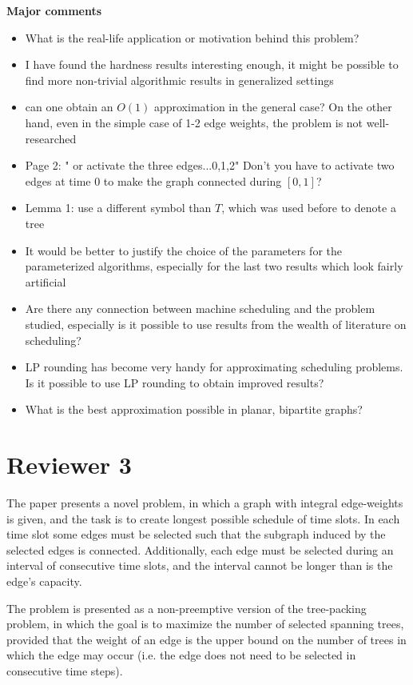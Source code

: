\documentclass[11pt,a4paper]{article}
\begin{document}
\textbf{Major comments}
\begin{itemize}

\item What is the real-life application or motivation behind this problem? 
\item I have found the hardness results interesting enough, it might be possible to find more non-trivial algorithmic results in generalized settings 
\item can one obtain an $O(1)$ approximation in the general case? On the other hand, even in the simple case of 1-2 edge weights, the problem is not well-researched
\item Page 2: " or activate the three edges...0,1,2" Don't you have to activate two edges at time 0 to make the graph connected during $[0,1]$?
\item Lemma 1: use a different symbol than $T$, which was used before to denote a tree
\item It would be better to justify the choice of the parameters for the parameterized algorithms, especially for the last two results which look fairly artificial
\item Are there any connection between machine scheduling and the problem studied, especially is it possible to use results from the wealth of literature on scheduling?
\item LP rounding has become very handy for approximating scheduling problems. Is it possible to use LP rounding to obtain improved results?
\item What is the best approximation possible in planar, bipartite graphs? 
\end{itemize}





\section*{Reviewer 3}

The paper presents a novel problem, in which a graph with integral edge-weights
is given, and the task is to create longest possible schedule of time slots. In
each time slot some edges must be selected such that the subgraph induced by
the selected edges is connected. Additionally, each edge must be selected
during an interval of consecutive time slots, and the interval cannot be longer
than is the edge's capacity.

The problem is presented as a non-preemptive version of the tree-packing
problem, in which the goal is to maximize the number of selected spanning
trees, provided that the weight of an edge is the upper bound on the number of
trees in which the edge may occur (i.e. the edge does not need to be selected
in consecutive time steps). 
\end{document}
